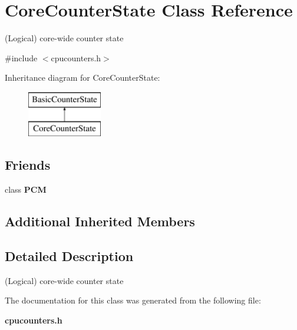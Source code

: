 \section{Core\+Counter\+State Class Reference}
\label{classCoreCounterState}


(Logical) core-\/wide counter state  




{\ttfamily \#include $<$cpucounters.\+h$>$}

Inheritance diagram for Core\+Counter\+State\+:\begin{figure}[H]
\begin{center}
\leavevmode
\includegraphics[height=2.000000cm]{classCoreCounterState}
\end{center}
\end{figure}
\subsection*{Friends}
\begin{DoxyCompactItemize}
\item 
class {\bfseries P\+CM}\label{classCoreCounterState_ab5f56d2e95ba3daf52c17b8a1d356d64}

\end{DoxyCompactItemize}
\subsection*{Additional Inherited Members}


\subsection{Detailed Description}
(Logical) core-\/wide counter state 

The documentation for this class was generated from the following file\+:\begin{DoxyCompactItemize}
\item 
{\bf cpucounters.\+h}\end{DoxyCompactItemize}
